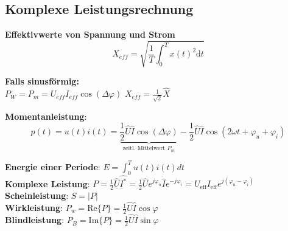 \begin{sectionbox}
    \subsection{Komplexe Leistungsrechnung}

    \textbf{Effektivwerte von Spannung und Strom}
    \begin{equation*}
        X_{eff} = \sqrt{\frac{1}{T}\int_0^Tx(t)^2 \mathrm dt}
    \end{equation*}

    \textbf{Falls sinusförmig:} \\
    $P_W=P_m = U_{eff}I_{eff}\cos(\Delta\varphi)$ \quad $X_{eff} = \frac{1}{\sqrt 2}\hat X$
    
    \textbf{Momentanleistung}:
    \begin{equation*}
        p(t) = u(t)i(t)=\underbrace{\frac{1}{2}\hat U \hat I \cos(\Delta \varphi)}_{\text{zeitl. Mittelwert } P_m}-\frac{1}{2}\hat U \hat I \cos(2\omega t + \varphi_u + \varphi_i)
    \end{equation*}
    
    \textbf{Energie einer Periode}: $E=\int_0^Tu(t)i(t)dt$\\
    \textbf{Komplexe Leistung}: $P = \frac{1}{2}\hat{\underline U} \hat{\underline I^*} = \frac{1}{2}\hat U e^{j\varphi_u} \hat I e^{-j\varphi_i} = U_{\text{eff}} I_{\text{eff}} e^{j(\varphi_u-\varphi_i)}$\\
    \textbf{Scheinleistung}: $S = |P|$\\
    \textbf{Wirkleistung}: $P_w = \text{Re}\{P\} = \frac{1}{2}\hat U\hat I\cos \varphi$\\
    \textbf{Blindleistung}: $P_B = \text{Im}\{P\} = \frac{1}{2}\hat U\hat I\sin \varphi$
    \end{sectionbox}